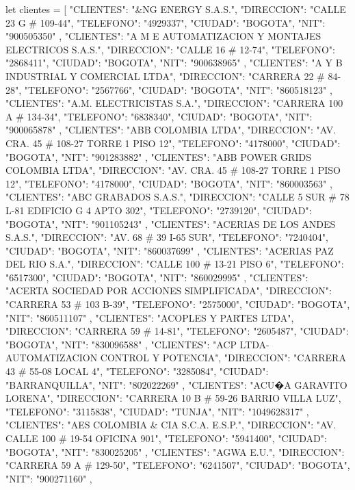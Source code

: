 let clientes = [{
   "CLIENTES": "&NG ENERGY S.A.S.",
   "DIRECCION": "CALLE 23 G # 109-44",
   "TELEFONO": "4929337",
   "CIUDAD": "BOGOTA",
   "NIT": "900505350"
   },
   {
   "CLIENTES": "A M E AUTOMATIZACION Y MONTAJES ELECTRICOS S.A.S.",
   "DIRECCION": "CALLE 16 # 12-74",
   "TELEFONO": "2868411",
   "CIUDAD": "BOGOTA",
   "NIT": "900638965"
   },
   {
   "CLIENTES": "A Y B INDUSTRIAL Y COMERCIAL LTDA",
   "DIRECCION": "CARRERA 22 # 84-28",
   "TELEFONO": "2567766",
   "CIUDAD": "BOGOTA",
   "NIT": "860518123"
   },
   {
   "CLIENTES": "A.M. ELECTRICISTAS S.A.",
   "DIRECCION": "CARRERA 100 A # 134-34",
   "TELEFONO": "6838340",
   "CIUDAD": "BOGOTA",
   "NIT": "900065878"
   },
   {
   "CLIENTES": "ABB COLOMBIA LTDA",
   "DIRECCION": "AV. CRA. 45 # 108-27 TORRE 1 PISO 12",
   "TELEFONO": "4178000",
   "CIUDAD": "BOGOTA",
   "NIT": "901283882"
   },
   {
   "CLIENTES": "ABB POWER GRIDS COLOMBIA LTDA",
   "DIRECCION": "AV. CRA. 45 # 108-27 TORRE 1 PISO 12",
   "TELEFONO": "4178000",
   "CIUDAD": "BOGOTA",
   "NIT": "860003563"
   },
   {
   "CLIENTES": "ABC GRABADOS S.A.S.",
   "DIRECCION": "CALLE 5 SUR # 78 L-81 EDIFICIO G 4 APTO 302",
   "TELEFONO": "2739120",
   "CIUDAD": "BOGOTA",
   "NIT": "901105243"
   },
   {
   "CLIENTES": "ACERIAS DE LOS ANDES S.A.S.",
   "DIRECCION": "AV. 68 # 39 I-65 SUR",
   "TELEFONO": "7240404",
   "CIUDAD": "BOGOTA",
   "NIT": "860037699"
   },
   {
   "CLIENTES": "ACERIAS PAZ DEL RIO S.A.",
   "DIRECCION": "CALLE 100 # 13-21 PISO 6",
   "TELEFONO": "6517300",
   "CIUDAD": "BOGOTA",
   "NIT": "860029995"
   },
   {
   "CLIENTES": "ACERTA SOCIEDAD POR ACCIONES SIMPLIFICADA",
   "DIRECCION": "CARRERA 53 # 103 B-39",
   "TELEFONO": "2575000",
   "CIUDAD": "BOGOTA",
   "NIT": "860511107"
   },
   {
   "CLIENTES": "ACOPLES Y PARTES LTDA",
   "DIRECCION": "CARRERA 59 # 14-81",
   "TELEFONO": "2605487",
   "CIUDAD": "BOGOTA",
   "NIT": "830096588"
   },
   {
   "CLIENTES": "ACP LTDA-AUTOMATIZACION CONTROL Y POTENCIA",
   "DIRECCION": "CARRERA 43 # 55-08 LOCAL 4",
   "TELEFONO": "3285084",
   "CIUDAD": "BARRANQUILLA",
   "NIT": "802022269"
   },
   {
   "CLIENTES": "ACU�A GARAVITO LORENA",
   "DIRECCION": "CARRERA 10 B # 59-26 BARRIO VILLA LUZ",
   "TELEFONO": "3115838",
   "CIUDAD": "TUNJA",
   "NIT": "1049628317"
   },
   {
   "CLIENTES": "AES COLOMBIA & CIA S.C.A. E.S.P.",
   "DIRECCION": "AV. CALLE 100 # 19-54 OFICINA 901",
   "TELEFONO": "5941400",
   "CIUDAD": "BOGOTA",
   "NIT": "830025205"
   },
   {
   "CLIENTES": "AGWA E.U.",
   "DIRECCION": "CARRERA 59 A # 129-50",
   "TELEFONO": "6241507",
   "CIUDAD": "BOGOTA",
   "NIT": "900271160"
   },
